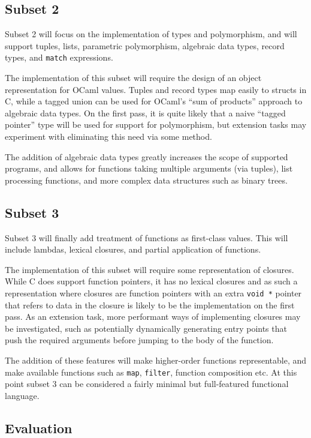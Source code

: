 \subsection*{Subset 2}

Subset 2 will focus on the implementation of types and polymorphism, and will
support tuples, lists, parametric polymorphism, algebraic data types, record
types, and \texttt{match} expressions.

The implementation of this subset will require the design of an object
representation for OCaml values. Tuples and record types map easily to structs
in C, while a tagged union can be used for OCaml's ``sum of products'' approach
to algebraic data types. On the first pass, it is quite likely that a naive
``tagged pointer'' type will be used for support for polymorphism, but
extension tasks may experiment with eliminating this need via some method.

The addition of algebraic data types greatly increases the scope of supported
programs, and allows for functions taking multiple arguments (via tuples), list
processing functions, and more complex data structures such as binary trees.

\subsection*{Subset 3}

Subset 3 will finally add treatment of functions as first-class values. This
will include lambdas, lexical closures, and partial application of functions.

The implementation of this subset will require some representation of closures.
While C does support function pointers, it has no lexical closures and as such
a representation where closures are function pointers with an extra
\texttt{void *} pointer that refers to data in the closure is likely to be the
implementation on the first pass. As an extension task, more performant ways of
implementing closures may be investigated, such as potentially dynamically
generating entry points that push the required arguments before jumping to the
body of the function. 

The addition of these features will make higher-order functions representable,
and make available functions such as \texttt{map}, \texttt{filter}, function
composition etc. At this point subset 3 can be considered a fairly minimal but
full-featured functional language.

\subsection*{Evaluation}

